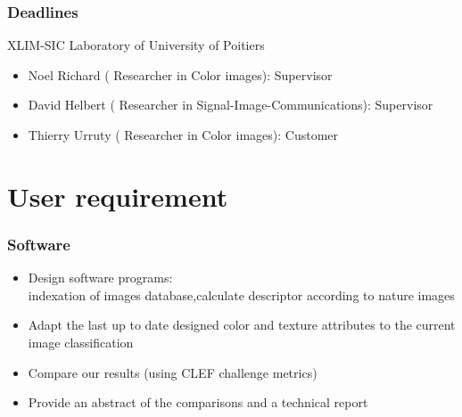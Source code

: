 \documentclass[xcolor=table]{beamer}
\begin{document}
\begin{frame} \frametitle{Deadlines}
XLIM-SIC Laboratory of University of Poitiers
\begin{itemize}
\item Noel Richard ( Researcher in Color images): Supervisor
\item David Helbert ( Researcher in Signal-Image-Communications): Supervisor
\item Thierry Urruty ( Researcher in Color images): Customer
\end{itemize}

\end{frame}

\section{User requirement}
\begin{frame} \frametitle{Software}
\begin{itemize}
 \item Design  software programs:\\
   indexation of  images database,calculate descriptor according to  nature images
\item Adapt the last up to date designed color and texture attributes to the current image classification
\item Compare our results (using CLEF challenge metrics)
\item Provide an abstract of the comparisons and a technical report
\end{itemize}






\end{frame}
\end{document}
